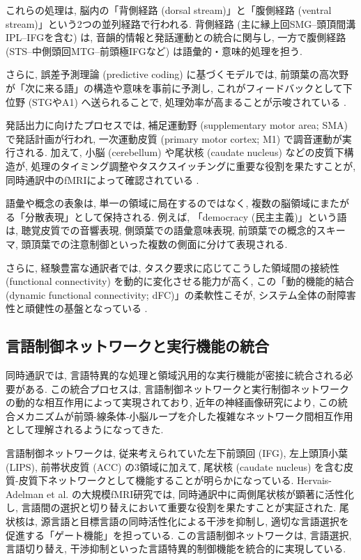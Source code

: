 これらの処理は, 脳内の「背側経路 (dorsal stream)」と「腹側経路 (ventral stream)」という2つの並列経路で行われる.
背側経路 (主に縁上回SMG--頭頂間溝IPL--IFGを含む) は, 音韻的情報と発話運動との統合に関与し, 一方で腹側経路 (STS--中側頭回MTG--前頭極IFGなど) は語彙的・意味的処理を担う.

さらに, 誤差予測理論 (predictive coding) に基づくモデルでは, 前頭葉の高次野が「次に来る語」の構造や意味を事前に予測し, これがフィードバックとして下位野 (STGやA1) へ送られることで, 処理効率が高まることが示唆されている \cite{Caucheteux2023Predictive,King2025WhatWhen}.

発話出力に向けたプロセスでは, 補足運動野 (supplementary motor area; SMA) で発話計画が行われ, 一次運動皮質 (primary motor cortex; M1) で調音運動が実行される.
加えて, 小脳 (cerebellum) や尾状核 (caudate nucleus) などの皮質下構造が, 処理のタイミング調整やタスクスイッチングに重要な役割を果たすことが, 同時通訳中のfMRIによって確認されている \cite{HervaisAdelman2015Extreme}.

語彙や概念の表象は, 単一の領域に局在するのではなく, 複数の脳領域にまたがる「分散表現」として保持される.
例えば, 「democracy (民主主義)」という語は, 聴覚皮質での音響表現, 側頭葉での語彙意味表現, 前頭葉での概念的スキーマ, 頭頂葉での注意制御といった複数の側面に分けて表現される.

さらに, 経験豊富な通訳者では, タスク要求に応じてこうした領域間の接続性 (functional connectivity) を動的に変化させる能力が高く, この「動的機能的結合 (dynamic functional connectivity; dFC)」の柔軟性こそが, システム全体の耐障害性と頑健性の基盤となっている \cite{Jones2024PhaseSync,Boos2025AccentsEEG}.

\subsection{言語制御ネットワークと実行機能の統合}

同時通訳では, 言語特異的な処理と領域汎用的な実行機能が密接に統合される必要がある.
この統合プロセスは, 言語制御ネットワークと実行制御ネットワークの動的な相互作用によって実現されており, 近年の神経画像研究により, この統合メカニズムが前頭-線条体-小脳ループを介した複雑なネットワーク間相互作用として理解されるようになってきた.

言語制御ネットワークは, 従来考えられていた左下前頭回 (IFG), 左上頭頂小葉 (LIPS), 前帯状皮質 (ACC) の3領域に加えて, 尾状核 (caudate nucleus) を含む皮質-皮質下ネットワークとして機能することが明らかになっている.
Hervais-Adelman et al. \cite{HervaisAdelman2014} の大規模fMRI研究では, 同時通訳中に両側尾状核が顕著に活性化し, 言語間の選択と切り替えにおいて重要な役割を果たすことが実証された.
尾状核は, 源言語と目標言語の同時活性化による干渉を抑制し, 適切な言語選択を促進する「ゲート機能」を担っている.
この言語制御ネットワークは, 言語選択, 言語切り替え, 干渉抑制といった言語特異的制御機能を統合的に実現している.

